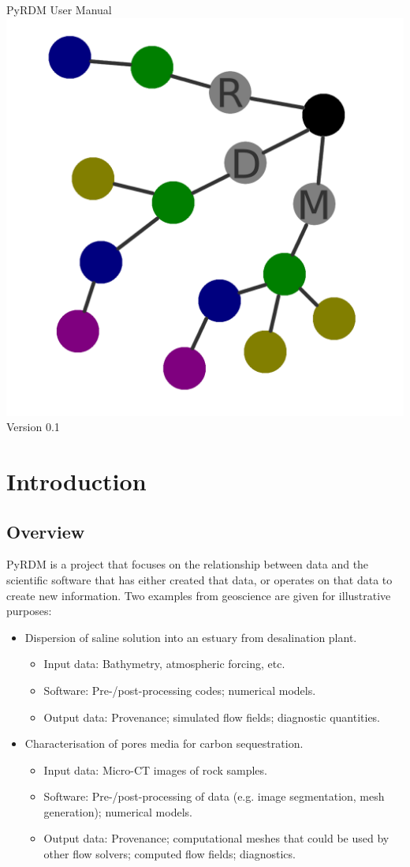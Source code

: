 \documentclass[a4paper,11pt]{report}
\begin{document}
\begin{titlepage}
\begin{center}
\vspace*{3cm}
\huge{PyRDM User Manual}\\\vspace*{2cm}
\includegraphics[width=0.4\columnwidth]{images/rdm.png}\\\vspace*{2cm}
\LARGE{Version 0.1}

\end{center}
\end{titlepage}

\tableofcontents

\chapter{Introduction}\label{chap:introduction}
\section{Overview}
PyRDM is a project that focuses on the relationship between data and the scientific software that has either created that data, or operates on that data to create new information. Two examples from geoscience are given for illustrative purposes:
\begin{itemize}
  \item Dispersion of saline solution into an estuary from desalination plant.
  \begin{itemize}
    \item Input data: Bathymetry, atmospheric forcing, etc.
    \item Software: Pre-/post-processing codes; numerical models.
    \item Output data: Provenance; simulated flow fields; diagnostic quantities.
  \end{itemize}
  \item Characterisation of pores media for carbon sequestration.
  \begin{itemize}
    \item Input data: Micro-CT images of rock samples.
    \item Software: Pre-/post-processing of data (e.g. image segmentation, mesh generation); numerical models.
    \item Output data: Provenance; computational meshes that could be used by other flow solvers; computed flow fields; diagnostics.
  \end{itemize}
\end{itemize}
\end{document}
